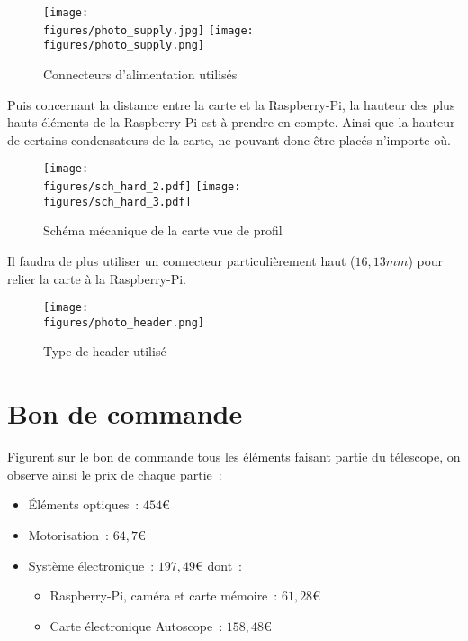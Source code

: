 \begin{figure}[H]
    \centering
    \texttt{[image: \\figures/photo\_supply.jpg]}
	\hspace{1cm}
    \texttt{[image: \\figures/photo\_supply.png]}
    \decoRule
    \caption[
    Connecteurs d'alimentation utilisés]{
    Connecteurs d'alimentation utilisés}
    \label{fig:Connecteurs d'alimentation utilisés}
    \end{figure}

\vspace{1cm}

Puis concernant la distance entre la carte et la Raspberry-Pi, la hauteur des plus hauts éléments de la Raspberry-Pi est à prendre en compte. Ainsi que la hauteur de certains condensateurs de la carte, ne pouvant donc être placés n'importe où.

\begin{figure}[H]
    \centering
    \texttt{[image: \\figures/sch\_hard\_2.pdf]}
    \texttt{[image: \\figures/sch\_hard\_3.pdf]}
    \decoRule
    \caption[
    Schéma mécanique de la carte vue de profil]{
    Schéma mécanique de la carte vue de profil}
    \label{fig:Schéma mécanique de la carte vue de profil}
    \end{figure}

\vspace{1cm}

Il faudra de plus utiliser un connecteur particulièrement haut ($16,13mm$) pour relier la carte à la Raspberry-Pi.

\begin{figure}[H]
    \centering
    \texttt{[image: \\figures/photo\_header.png]}
    \decoRule
    \caption[
    Type de header utilisé]{
    Type de header utilisé}
    \label{fig:Type de header utilisé}
    \end{figure}

\newpage
\section{Bon de commande}

Figurent sur le bon de commande tous les éléments faisant partie du télescope, on observe ainsi le prix de chaque partie~:
\begin{itemize}[label=$\bullet$]
	\item Éléments optiques~: $454$€
	\item Motorisation~: $64,7$€
	\item Système électronique~: $197,49$€ dont~:
	\begin{itemize}
		\item Raspberry-Pi, caméra et carte mémoire~: $61,28$€
		\item Carte électronique Autoscope~: $158,48$€
		\end{itemize}
	\end{itemize}

